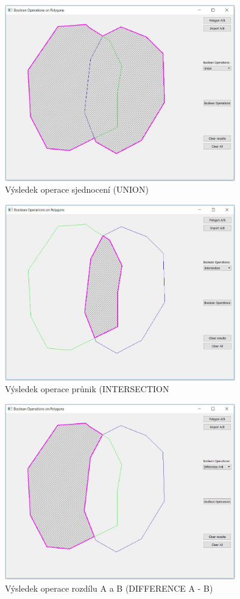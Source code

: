 \documentclass[a4paper, 12pt]{article}
\begin{document}
\begin{figure}[h!]
\centering
\includegraphics[width=10cm]{pictures/union.jpg}
\caption{Výsledek operace sjednocení (UNION)}
\end{figure}

\begin{figure}[h!]
\centering
\includegraphics[width=10cm]{pictures/intersection.jpg}
\caption{Výsledek operace průnik (INTERSECTION}
\end{figure}

\begin{figure}[h!]
\centering
\includegraphics[width=10cm]{pictures/diffAB.jpg}
\caption{Výsledek operace rozdílu A a B (DIFFERENCE A - B)}
\end{figure}
\end{document}
